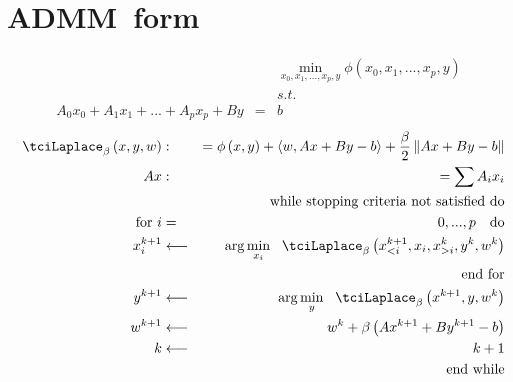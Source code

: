 \documentclass{article}
\begin{document}
\section{ADMM\ form}

\begin{eqnarray*}
&&\min_{x_{0},x_{1},...,x_{p},y}\phi \left( x_{0},x_{1},...,x_{p},y\right) \\
&&s.t. \\
A_{0}x_{0}+A_{1}x_{1}+...+A_{p}x_{p}+By &=&b
\end{eqnarray*}%
\begin{eqnarray*}
\tciLaplace _{\beta }\left( x,y,w\right) &:&=\phi \left( x,y\right)
+\left\langle w,Ax+By-b\right\rangle +\frac{\beta }{2}\left\Vert
Ax+By-b\right\Vert \\
Ax &:&=\sum A_{i}x_{i} \\
&&\text{while stopping criteria not satisfied do} \\
\text{for }i &=&0,...,p\text{ do} \\
x_{i}^{k+1} &\longleftarrow &\arg \min_{x_{i}}\tciLaplace _{\beta }\left(
x_{<i}^{k+1},x_{i},x_{>i}^{k},y^{k},w^{k}\right) \\
&&\text{end for} \\
y^{k+1} &\longleftarrow &\arg \min_{y}\tciLaplace _{\beta }\left(
x^{k+1},y,w^{k}\right) \\
w^{k+1} &\longleftarrow &w^{k}+\beta \left( Ax^{k+1}+By^{k+1}-b\right) \\
k &\longleftarrow &k+1 \\
&&\text{end while}
\end{eqnarray*}
\end{document}
